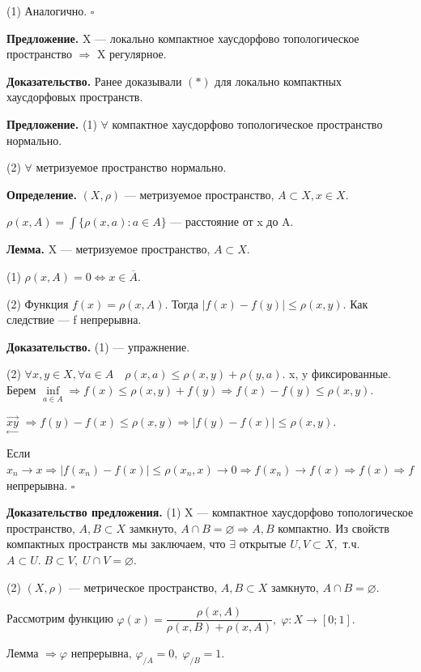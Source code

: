 \documentclass[12pt,a4paper]{article}
\begin{document}
(1) Аналогично. $\square$

\textbf{Предложение.} X --- локально компактное хаусдорфово топологическое пространство $\Rightarrow$ X регулярное.

\textbf{Доказательство.} Ранее доказывали $(*)$ для локально компактных хаусдорфовых пространств.

\textbf{Предложение.} (1) $\forall$ компактное хаусдорфово топологическое пространство нормально.

(2) $\forall$ метризуемое пространство нормально.

\textbf{Определение.} $(X, \rho)$ --- метризуемое пространство, $A \subset X, x \in X.$

$\rho(x, A) = \int\{\rho(x, a)\!: a \in A\}$ --- расстояние от x до A.

\textbf{Лемма.} X --- метризуемое пространство, $A \subset X.$

(1) $\rho(x, A) = 0 \Leftrightarrow x \in \overline{A}.$

(2) Функция $f(x) = \rho(x, A).$ Тогда $|f(x) - f(y)| \leq \rho(x, y).$ Как следствие --- f непрерывна. 

\textbf{Доказательство.} (1) --- упражнение.

(2) $\forall x, y \in X, \forall a \in A \quad \rho(x, a) \leq \rho(x, y) + \rho(y, a).$ x, y фиксированные. Берем $\underset{a \in A}{\inf} \Rightarrow f(x) \leq \rho(x, y) + f(y) \Rightarrow f(x) - f(y) \leq \rho(x, y).$

$\underset{\leftarrow}{\overset{\rightarrow}{x  y}}$ $\Rightarrow f(y) - f(x) \leq \rho(x, y) \Rightarrow |f(y) - f(x)| \leq \rho(x, y).$

Если $x_{n} \to x \Rightarrow |f(x_{n}) - f(x)| \leq \rho(x_{n}, x) \to 0 \Rightarrow f(x_{n}) \to f(x) \Rightarrow f(x) \Rightarrow f$ непрерывна. $\square$

\textbf{Доказательство предложения.} (1) X --- компактное хаусдорфово топологическое пространство, $A, B \subset X$ замкнуто, $A \cap B = \varnothing \Rightarrow A, B$ компактно. Из свойств компактных пространств мы заключаем, что $\exists$ открытые $U, V \subset X,$ т.ч. $A \subset U. \; B \subset V, \; U \cap V = \varnothing.$

(2) $(X, \rho)$ --- метрическое пространство, $A, B \subset X$ замкнуто, $A \cap B = \varnothing.$

Рассмотрим функцию $\varphi(x) = \dfrac{\rho(x, A)}{\rho(x, B) + \rho(x, A)}, \; \varphi\!: X \to [0; 1].$

Лемма $\Rightarrow \varphi$ непрерывна, $\varphi_{/A} = 0, \; \varphi_{/B} = 1.$
\end{document}

